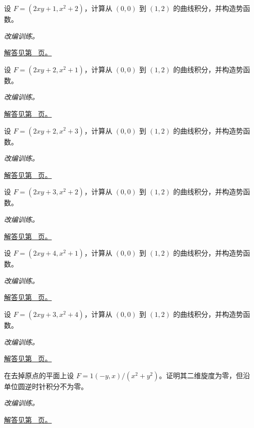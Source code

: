 \documentclass[UTF8,12pt,a4paper,fontset=fandol]{ctexart}
\begin{document}
\begin{example}[势函数与路径无关]\label{ex:c41q14}
设 $F=(2xy+1,x^2+2)$，计算从 $(0,0)$ 到 $(1,2)$ 的曲线积分，并构造势函数。
\par\textit{改编训练。}\par\hyperref[ans:c41q14]{解答见第~\pageref{ans:c41q14} 页。}
\end{example}
\begin{example}[势函数与路径无关]\label{ex:c41q15}
设 $F=(2xy+2,x^2+1)$，计算从 $(0,0)$ 到 $(1,2)$ 的曲线积分，并构造势函数。
\par\textit{改编训练。}\par\hyperref[ans:c41q15]{解答见第~\pageref{ans:c41q15} 页。}
\end{example}
\begin{example}[势函数与路径无关]\label{ex:c41q16}
设 $F=(2xy+2,x^2+3)$，计算从 $(0,0)$ 到 $(1,2)$ 的曲线积分，并构造势函数。
\par\textit{改编训练。}\par\hyperref[ans:c41q16]{解答见第~\pageref{ans:c41q16} 页。}
\end{example}
\begin{example}[势函数与路径无关]\label{ex:c41q17}
设 $F=(2xy+3,x^2+2)$，计算从 $(0,0)$ 到 $(1,2)$ 的曲线积分，并构造势函数。
\par\textit{改编训练。}\par\hyperref[ans:c41q17]{解答见第~\pageref{ans:c41q17} 页。}
\end{example}
\begin{example}[势函数与路径无关]\label{ex:c41q18}
设 $F=(2xy+4,x^2+1)$，计算从 $(0,0)$ 到 $(1,2)$ 的曲线积分，并构造势函数。
\par\textit{改编训练。}\par\hyperref[ans:c41q18]{解答见第~\pageref{ans:c41q18} 页。}
\end{example}
\begin{example}[势函数与路径无关]\label{ex:c41q19}
设 $F=(2xy+3,x^2+4)$，计算从 $(0,0)$ 到 $(1,2)$ 的曲线积分，并构造势函数。
\par\textit{改编训练。}\par\hyperref[ans:c41q19]{解答见第~\pageref{ans:c41q19} 页。}
\end{example}
\begin{example}[有孔区域与无旋场]\label{ex:c41q20}
在去掉原点的平面上设 $F=1(-y,x)/(x^2+y^2)$。证明其二维旋度为零，但沿单位圆逆时针积分不为零。
\par\textit{改编训练。}\par\hyperref[ans:c41q20]{解答见第~\pageref{ans:c41q20} 页。}
\end{example}
\end{document}
